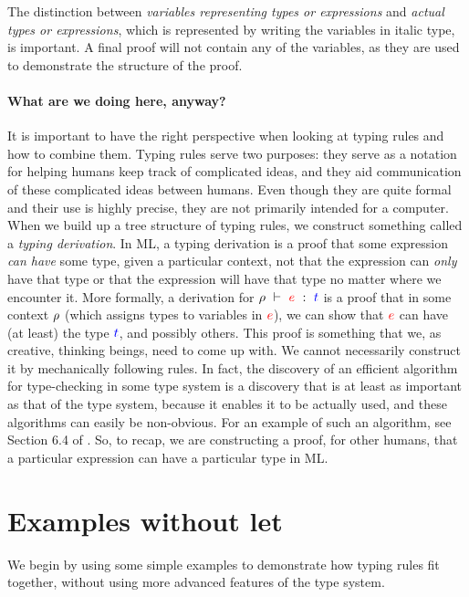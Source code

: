 \documentclass[a4paper]{article}
\newcommand{\expr}[1]{\ensuremath{\textcolor{term}{#1}}}
\newcommand{\type}[1]{\ensuremath{\textcolor{blue}{#1}}}
\newcommand{\context}[1]{\ensuremath{\textcolor{black}{#1}}}
\newcommand{\typing}[3]{\ensuremath{#1\ \vdash\ #2\ :\ #3}}
\newcommand{\RHO}{\context{\rho}}
\begin{document}
\noindent
The distinction between \emph{variables representing types or expressions} and
\emph{actual types or expressions}, which is represented by writing the
variables in italic type, is important.  A final proof will not contain any of
the variables, as they are used to demonstrate the structure of the proof.

\paragraph{What are we doing here, anyway?}
It is important to have the right perspective when looking at typing rules and how to combine them.
Typing rules serve two purposes: they serve as a notation for helping humans keep track of complicated ideas, and they aid communication of these complicated ideas between humans.
Even though they are quite formal and their use is highly precise, they are not primarily intended for a computer.
When we build up a tree structure of typing rules, we construct something called a \emph{typing derivation}.
In ML, a typing derivation is a proof that some expression \emph{can have} some type, given a particular context, not that the expression can \emph{only} have that type or that the expression will have that type no matter where we encounter it.
More formally, a derivation for $\typing{\RHO}{\expr{e}}{\type{t}}$ is a proof that in some context $\RHO$ (which assigns types to variables in $\expr{e}$), we can show that $\expr{e}$ can have (at least) the type $\type{t}$, and possibly others.
This proof is something that we, as creative, thinking beings, need to come up with.
We cannot necessarily construct it by mechanically following rules.
In fact, the discovery of an efficient algorithm for type-checking in some type system is a discovery that is at least as important as that of the type system, because it enables it to be actually used, and these algorithms can easily be non-obvious.
For an example of such an algorithm, see Section 6.4 of \citet{Sestoft2012}.
So, to recap, we are constructing a proof, for other humans, that a particular expression can have a particular type in ML.


\section{Examples without let}
\label{sec:examples-without-let}

We begin by using some simple examples to demonstrate how typing rules fit
together, without using more advanced features of the type system.
\end{document}
